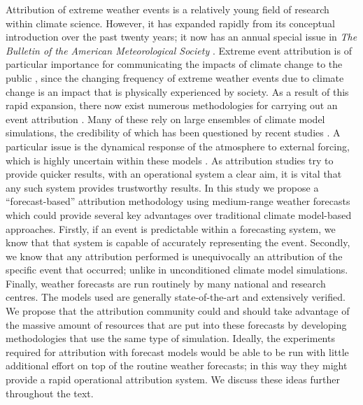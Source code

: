   Attribution of extreme weather events is a relatively young field of research within climate science. However, it has expanded rapidly from its conceptual introduction \citep{allen_liability_2003} over the past twenty years; it now has an annual special issue in \emph{The Bulletin of the American Meteorological Society} \citep{peterson_explaining_2012}. Extreme event attribution is of particular importance for communicating the impacts of climate change to the public \citep{hulme_attributing_2014,hassol_natural_2016}, since the changing frequency of extreme weather events due to climate change is an impact that is physically experienced by society. As a result of this rapid expansion, there now exist numerous methodologies for carrying out an event attribution \citep{herring_explaining_2021}. Many of these rely on large ensembles of climate model simulations, the credibility of which has been questioned by recent studies \citep{bellprat_attribution_2016,bellprat_towards_2019,palmer_simple_2018}. A particular issue is the dynamical response of the atmosphere to external forcing, which is highly uncertain within these models \citep{shepherd_common_2016}. As attribution studies try to provide quicker results, with an operational system a clear aim, it is vital that any such system provides trustworthy results. In this study we propose a “forecast-based” attribution methodology using medium-range weather forecasts which could provide several key advantages over traditional climate model-based approaches. Firstly, if an event is predictable within a forecasting system, we know that that system is capable of accurately representing the event. Secondly, we know that any attribution performed is unequivocally an attribution of the specific event that occurred; unlike in unconditioned climate model simulations. Finally, weather forecasts are run routinely by many national and research centres. The models used are generally state-of-the-art and extensively verified. We propose that the attribution community could and should take advantage of the massive amount of resources that are put into these forecasts by developing methodologies that use the same type of simulation. Ideally, the experiments required for attribution with forecast models would be able to be run with little additional effort on top of the routine weather forecasts; in this way they might provide a rapid operational attribution system. We discuss these ideas further throughout the text.

